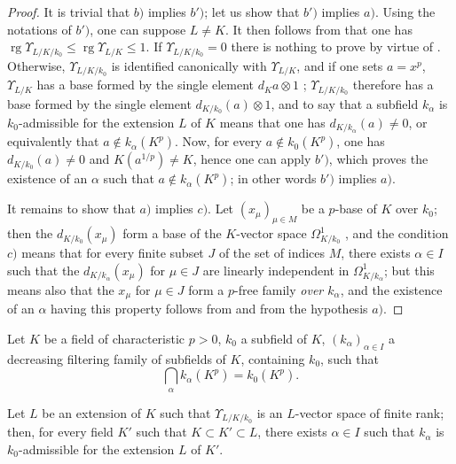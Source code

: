 \begin{proof}
It is trivial that $b)$ implies $b')$; let us show that $b')$ implies $a)$.
Using the notations of $b')$, one can suppose $L\neq K$.
It then follows from  that one has $\operatorname{rg}\Upsilon_{L/K/k_0}\leqslant\operatorname{rg}\Upsilon_{L/K}\leqslant 1$.
If $\Upsilon_{L/K/k_0}=0$ there is nothing to prove by virtue of .
Otherwise, $\Upsilon_{L/K/k_0}$ is identified canonically with $\Upsilon_{L/K}$, and if one sets $a=x^p$, $\Upsilon_{L/K}$ has a base formed by the single element $d_Ka\otimes 1$ ; $\Upsilon_{L/K/k_0}$ therefore has a base formed by the single element $d_{K/k_0}(a)\otimes 1$, and to say that a subfield $k_\alpha$ is $k_0$-admissible for the extension $L$ of $K$ means that one has $d_{K/k_\alpha}(a)\neq 0$, or equivalently  that $a\notin k_\alpha(K^p)$.
Now, for every $a\notin k_0(K^p)$, one has $d_{K/k_0}(a)\neq 0$ and $K(a^{1/p})\neq K$, hence one can apply $b')$, which proves the existence of an $\alpha$ such that $a\notin k_\alpha(K^p)$; in other words $b')$ implies $a)$.

It remains to show that $a)$ implies $c)$.
Let $(x_\mu)_{\mu\in M}$ be a $p$-base of $K$ over $k_0$; then the $d_{K/k_0}(x_\mu)$ form a base of the $K$-vector space $\Omega^1_{K/k_0}$ , and the condition $c)$ means that for every finite subset $J$ of the set of indices $M$, there exists $\alpha\in I$ such that the $d_{K/k_\alpha}(x_\mu)$ for $\mu\in J$ are linearly independent in $\Omega^1_{K/k_\alpha}$; but this means also  that the $x_\mu$ for $\mu\in J$ form a $p$-free family \emph{over $k_\alpha$}, and the existence of an $\alpha$ having this property follows from  and from the hypothesis $a)$.
\end{proof}


\begin{corollary}[21.8.4]
\label{0.21.8.4}
Let $K$ be a field of characteristic $p>0$, $k_0$ a subfield of $K$, $(k_\alpha)_{\alpha\in I}$ a decreasing filtering family of subfields of $K$, containing $k_0$, such that
\[
  \bigcap_\alpha k_\alpha(K^p)=k_0(K^p).
\]

Let $L$ be an extension of $K$ such that $\Upsilon_{L/K/k_0}$ is an $L$-vector space of finite rank; then, for every field $K'$ such that $K\subset K'\subset L$, there exists $\alpha\in I$ such that $k_\alpha$ is $k_0$-admissible for the extension $L$ of $K'$.
\end{corollary}

